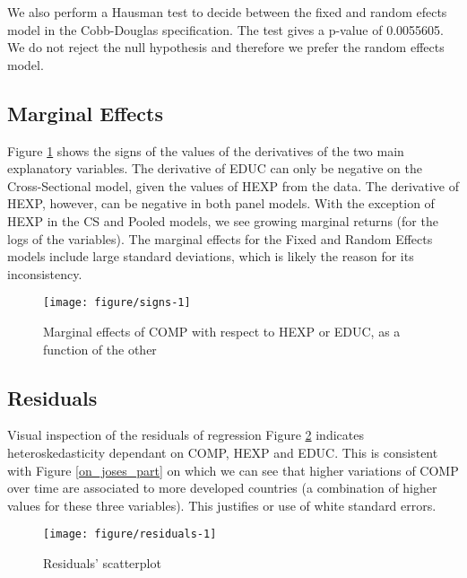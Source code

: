 \documentclass[12pt,a4paper]{article}\usepackage[]{graphicx}\usepackage[]{color}
\makeatletter
\def\maxwidth{ %
  \ifdim\Gin@nat@width>\linewidth
    \linewidth
  \else
    \Gin@nat@width
  \fi
}
\newenvironment{knitrout}{}{} %
\makeatother
\begin{document}
We also perform a Hausman test to decide between the fixed and random efects model in the Cobb-Douglas specification. The test gives a p-value of 0.0055605. We do not reject the null hypothesis and therefore we prefer the random effects model.

\subsection{Marginal Effects}
Figure \ref{fig:signs} shows the signs of the values of the derivatives of the two main explanatory variables. The derivative of EDUC can only be negative on the Cross-Sectional model, given the values of HEXP from the data. The derivative of HEXP, however, can be negative in both panel models. With the exception of HEXP in the CS and Pooled models, we see growing marginal returns (for the logs of the variables). The marginal effects for the Fixed and Random Effects models include large standard deviations, which is likely the reason for its inconsistency.
\begin{knitrout}
\color{fgcolor}\begin{figure}
\texttt{[image: figure/signs-1]} \caption[Marginal effects of COMP with respect to HEXP or EDUC, as a function of the other]{Marginal effects of COMP with respect to HEXP or EDUC, as a function of the other}\label{fig:signs}
\end{figure}


\end{knitrout}
\subsection{Residuals}
Visual inspection of the residuals of regression Figure \ref{fig:residuals} indicates heteroskedasticity dependant on COMP, HEXP and EDUC. This is consistent with Figure \ref{on_joses_part} on which we can see that higher variations of COMP over time are associated to more developed countries (a combination of higher values for these three variables). This justifies or use of white standard errors.
\begin{knitrout}
\color{fgcolor}\begin{figure}[!htbp]

{\centering \texttt{[image: figure/residuals-1]} 

}

\caption[Residuals' scatterplot]{Residuals' scatterplot}\label{fig:residuals}
\end{figure}


\end{knitrout}
\end{document}
